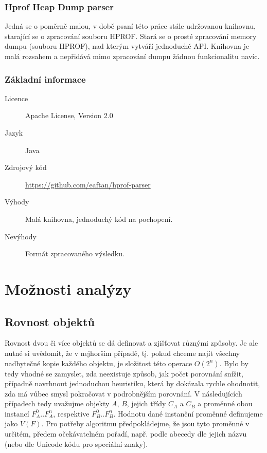 \subsection{Hprof Heap Dump parser}
Jedná se o poměrně malou, v době psaní této práce stále udržovanou knihovnu, starající se o zpracování souboru HPROF. Stará se o prosté zpracování memory dumpu (souboru HPROF), nad kterým vytváří jednoduché API. Knihovna je malá rozsahem a nepřidává mimo zpracování dumpu žádnou funkcionalitu navíc.

\subsection{Základní informace}

\begin{description}
    \item[Licence] Apache License, Version 2.0
    \item[Jazyk] Java
    \item[Zdrojový kód] \url{https://github.com/eaftan/hprof-parser}
    \item[Výhody] Malá knihovna, jednoduchý kód na pochopení.
    \item[Nevýhody] Formát zpracovaného výsledku.
\end{description}




\chapter{Možnosti analýzy}

\section{Rovnost objektů}
Rovnost dvou či více objektů se dá definovat a zjišťovat různými způsoby. Je ale nutné si uvědomit, že v nejhorším případě, tj. pokud chceme najít všechny nadbytečné kopie každého objektu, je složitost této operace $O(2^n)$. Bylo by tedy vhodné se zamyslet, zda neexistuje způsob, jak počet porovnání snížit, případně navrhnout jednoduchou heuristiku, která by dokázala rychle ohodnotit, zda má vůbec smysl pokračovat v podrobnějším porovnání. V následujících případech tedy uvažujme objekty $A$, $B$, jejich třídy $C_A$ a $C_B$ a proměnné obou instancí $F_A^0..F_A^n$, respektive $F_B^0..F_B^n$. Hodnotu dané instanční proměnné definujeme jako $V(F)$. Pro potřeby algoritmu předpokládejme, že jsou tyto proměnné v určitém, předem očekávatelném pořadí, např. podle abecedy dle jejich názvu (nebo dle Unicode kódu pro speciální znaky).

